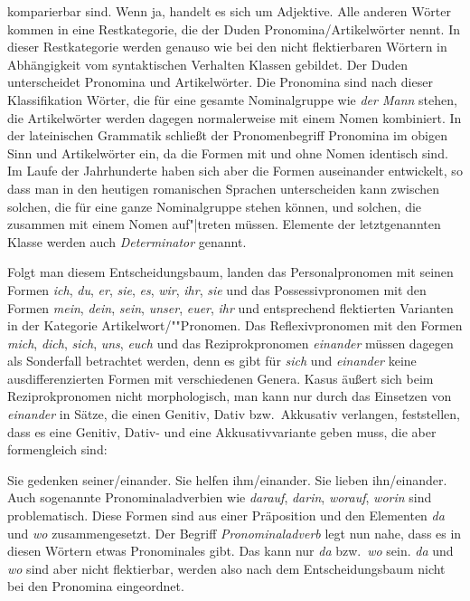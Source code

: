 \documentclass[ number=45
			   ,series=eotms
			   ,printondemand
			  ]{langsci}
\begin{document}
{komparierbar sind. Wenn ja, handelt es sich um Adjektive. Alle anderen Wörter kommen in eine Restkategorie, die der Duden Pronomina/Artikelwörter
nennt. In dieser Restkategorie werden genauso wie bei den nicht flektierbaren Wörtern in
Abhängigkeit vom syntaktischen Verhalten Klassen gebildet. Der Duden unterscheidet Pronomina und
Artikelwörter. Die Pronomina sind nach dieser Klassifikation Wörter, die für eine gesamte Nominalgruppe wie
\emph{der Mann} stehen, die Artikelwörter werden dagegen normalerweise mit einem Nomen kombiniert.
In der lateinischen Grammatik schließt der Pronomenbegriff Pronomina im obigen Sinn und
Artikelwörter ein, da die Formen mit und ohne Nomen identisch sind. Im Laufe der Jahrhunderte haben
sich aber die Formen auseinander entwickelt, so dass man in den heutigen romanischen
Sprachen unterscheiden kann zwischen solchen, die für eine ganze Nominalgruppe
stehen können, und solchen, die zusammen mit einem Nomen auf"|treten müssen. Elemente der
letztgenannten Klasse werden auch \emph{Determinator} genannt. 
%


Folgt man diesem Entscheidungsbaum, landen \zb das Personalpronomen mit seinen Formen
\emph{ich}, \emph{du}, \emph{er}, \emph{sie}, \emph{es}, \emph{wir}, \emph{ihr}, \emph{sie} und das
Possessivpronomen mit den Formen \emph{mein}, \emph{dein}, \emph{sein}, \emph{unser}, \emph{euer},
\emph{ihr} und entsprechend flektierten Varianten in der Kategorie Artikelwort/""Pronomen.  Das
Reflexivpronomen mit den Formen \emph{mich}, \emph{dich}, \emph{sich}, \emph{uns}, \emph{euch} und
das Reziprokpronomen \emph{einander} müssen dagegen als Sonderfall betrachtet werden, denn es gibt
für \emph{sich} und \emph{einander} keine ausdifferenzierten Formen mit verschiedenen Genera. Kasus
äußert sich beim Reziprokpronomen nicht morphologisch, man kann nur durch das Einsetzen von
\emph{einander} in Sätze, die einen Genitiv, Dativ bzw.\ Akkusativ verlangen, feststellen, dass es eine
Genitiv, Dativ- und eine Akkusativvariante geben muss, die aber formengleich sind:

\eal
\ex Sie gedenken seiner/einander.
\ex Sie helfen ihm/einander.
\ex Sie lieben ihn/einander.
\zl
%
Auch sogenannte Pronominaladverbien wie \emph{darauf}, \emph{darin}, \emph{worauf}, \emph{worin}
sind problematisch. Diese Formen sind aus einer Präposition und den Elementen \emph{da} und
\emph{wo} zusammengesetzt. Der Begriff \emph{Pronominaladverb} legt nun nahe, dass es in diesen
Wörtern etwas Pronominales gibt. Das kann nur \emph{da} bzw.\ \emph{wo} sein. \emph{da} und
\emph{wo} sind aber nicht flektierbar, werden also nach dem Entscheidungsbaum nicht bei den
Pronomina eingeordnet. 

}
\end{document}

